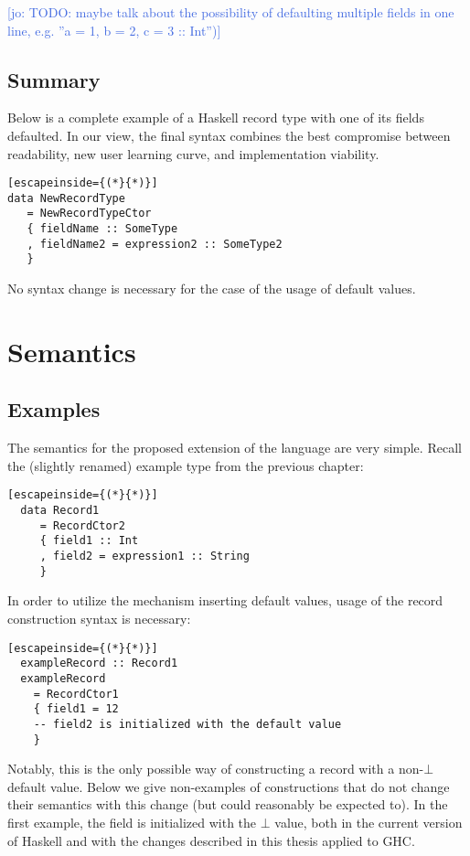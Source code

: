 \documentclass[en]{pracamgr}
\newcommand{\jcom}[1]{\textcolor{RoyalBlue}{[jo: #1]}}
\begin{document}
\jcom{TODO: maybe talk about the possibility of defaulting multiple fields in one line, e.g. ''a = 1, b = 2, c = 3 :: Int'')}

\section{Summary}
Below is a complete example of a Haskell record type with one of its fields defaulted. 
In our view, the final syntax combines the best compromise between readability, new user learning curve, and implementation viability.

\begin{lstlisting}[escapeinside={(*}{*)}]
data NewRecordType
   = NewRecordTypeCtor 
   { fieldName :: SomeType 
   , fieldName2 = expression2 :: SomeType2
   }
\end{lstlisting}
No syntax change is necessary for the case of the usage of default values.


\chapter{Semantics}
\section{Examples}
The semantics for the proposed extension of the language are very simple.
Recall the (slightly renamed) example type from the previous chapter:

\begin{lstlisting}[escapeinside={(*}{*)}]
  data Record1
     = RecordCtor2 
     { field1 :: Int
     , field2 = expression1 :: String
     }
\end{lstlisting}
  
In order to utilize the mechanism inserting default values, usage of the record construction syntax is necessary:

\begin{lstlisting}[escapeinside={(*}{*)}]
  exampleRecord :: Record1
  exampleRecord 
    = RecordCtor1
    { field1 = 12
    -- field2 is initialized with the default value
    }
\end{lstlisting}

Notably, this is the only possible way of constructing a record with a non-$\bot$ default value.
Below we give non-examples of constructions that do not change their semantics with this change (but could reasonably be expected to).
In the first example, the field is initialized with the $\bot$ value, both in the current version of Haskell and with the changes described in this thesis applied to GHC.
\end{document}

